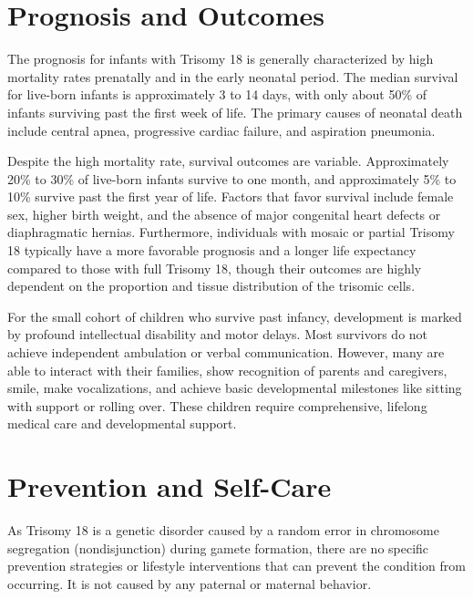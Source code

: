 \section*{Prognosis and Outcomes}
The prognosis for infants with Trisomy 18 is generally characterized by high mortality rates prenatally and in the early neonatal period. The median survival for live-born infants is approximately 3 to 14 days, with only about 50\% of infants surviving past the first week of life. The primary causes of neonatal death include central apnea, progressive cardiac failure, and aspiration pneumonia.

Despite the high mortality rate, survival outcomes are variable. Approximately 20\% to 30\% of live-born infants survive to one month, and approximately 5\% to 10\% survive past the first year of life. Factors that favor survival include female sex, higher birth weight, and the absence of major congenital heart defects or diaphragmatic hernias. Furthermore, individuals with mosaic or partial Trisomy 18 typically have a more favorable prognosis and a longer life expectancy compared to those with full Trisomy 18, though their outcomes are highly dependent on the proportion and tissue distribution of the trisomic cells.

For the small cohort of children who survive past infancy, development is marked by profound intellectual disability and motor delays. Most survivors do not achieve independent ambulation or verbal communication. However, many are able to interact with their families, show recognition of parents and caregivers, smile, make vocalizations, and achieve basic developmental milestones like sitting with support or rolling over. These children require comprehensive, lifelong medical care and developmental support.

\section*{Prevention and Self-Care}
As Trisomy 18 is a genetic disorder caused by a random error in chromosome segregation (nondisjunction) during gamete formation, there are no specific prevention strategies or lifestyle interventions that can prevent the condition from occurring. It is not caused by any paternal or maternal behavior.

